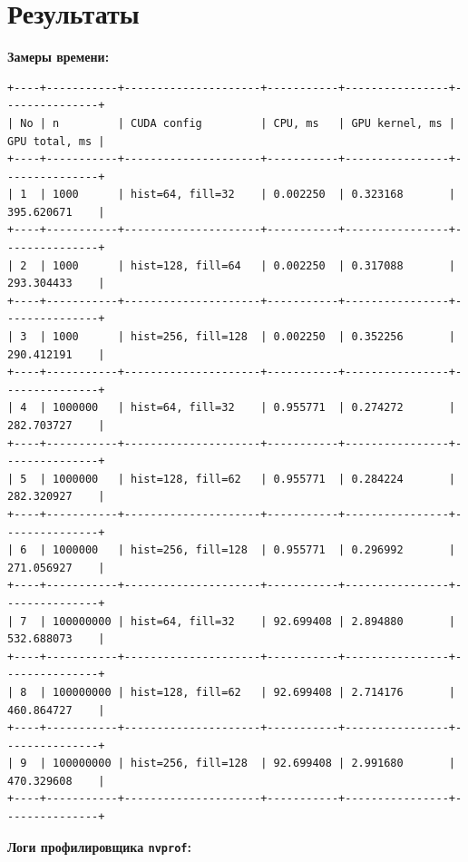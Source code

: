 \documentclass[a4paper,14pt]{extarticle}
\begin{document}
\section*{Результаты}
\textbf{Замеры времени:}

\begin{lstlisting}[basicstyle=\ttfamily\scriptsize,frame=single]
+----+-----------+---------------------+-----------+----------------+---------------+
| No | n         | CUDA config         | CPU, ms   | GPU kernel, ms | GPU total, ms |
+----+-----------+---------------------+-----------+----------------+---------------+
| 1  | 1000      | hist=64, fill=32    | 0.002250  | 0.323168       | 395.620671    |
+----+-----------+---------------------+-----------+----------------+---------------+
| 2  | 1000      | hist=128, fill=64   | 0.002250  | 0.317088       | 293.304433    |
+----+-----------+---------------------+-----------+----------------+---------------+
| 3  | 1000      | hist=256, fill=128  | 0.002250  | 0.352256       | 290.412191    |
+----+-----------+---------------------+-----------+----------------+---------------+
| 4  | 1000000   | hist=64, fill=32    | 0.955771  | 0.274272       | 282.703727    |
+----+-----------+---------------------+-----------+----------------+---------------+
| 5  | 1000000   | hist=128, fill=62   | 0.955771  | 0.284224       | 282.320927    |
+----+-----------+---------------------+-----------+----------------+---------------+
| 6  | 1000000   | hist=256, fill=128  | 0.955771  | 0.296992       | 271.056927    |
+----+-----------+---------------------+-----------+----------------+---------------+
| 7  | 100000000 | hist=64, fill=32    | 92.699408 | 2.894880       | 532.688073    |
+----+-----------+---------------------+-----------+----------------+---------------+
| 8  | 100000000 | hist=128, fill=62   | 92.699408 | 2.714176       | 460.864727    |
+----+-----------+---------------------+-----------+----------------+---------------+
| 9  | 100000000 | hist=256, fill=128  | 92.699408 | 2.991680       | 470.329608    |
+----+-----------+---------------------+-----------+----------------+---------------+
\end{lstlisting}

\textbf{Логи профилировщика \texttt{nvprof}:}
\end{document}
